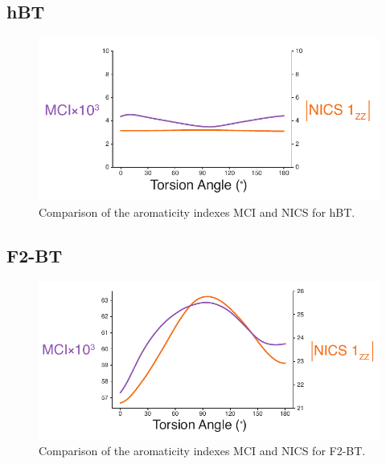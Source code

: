 \subsection{hBT}
\begin{figure}[hbt!]
    \centering
    \includegraphics{figures/append_aroma/hpt_aroma_compare_copy.pdf}
    \caption{Comparison of the aromaticity indexes MCI and NICS for hBT.}
    \label{fig:hpt_aroma_compare}
\end{figure}

\clearpage
\subsection{F2-BT}
\begin{figure}[hbt!]
    \centering
    \includegraphics{figures/append_aroma/pt_f2_aroma_compare_copy.pdf}
    \caption{Comparison of the aromaticity indexes MCI and NICS for F2-BT.}
    \label{fig:pt_f2_aroma_compare}
\end{figure}


